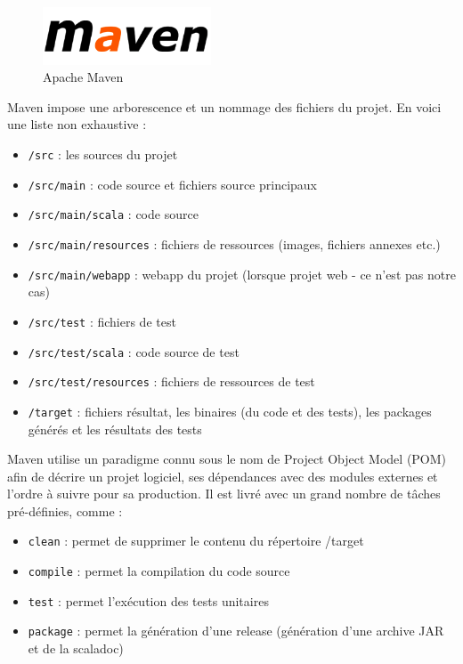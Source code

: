\documentclass[a4paper,11pt]{article}
\begin{document}
	\begin{figure}[!ht]
		\center
		\includegraphics [width=50mm]{./images/maven.png}
		\caption{Apache Maven}
	\end{figure}

Maven impose une arborescence et un nommage des fichiers du projet. En voici une liste non exhaustive :
	\begin{itemize}
		\item \texttt{/src} : les sources du projet
		\item \texttt{/src/main} : code source et fichiers source principaux
		\item \texttt{/src/main/scala} : code source
		\item \texttt{/src/main/resources} : fichiers de ressources (images, fichiers annexes etc.)
		\item \texttt{/src/main/webapp} : webapp du projet (lorsque projet web - ce n'est pas notre cas)
		\item \texttt{/src/test} : fichiers de test
		\item \texttt{/src/test/scala} : code source de test
		\item \texttt{/src/test/resources} : fichiers de ressources de test
		\item \texttt{/target} : fichiers résultat, les binaires (du code et des tests), les packages générés et les résultats des tests
	\end{itemize}
	
Maven utilise un paradigme connu sous le nom de Project Object Model (POM) afin de décrire un projet logiciel, ses dépendances avec des modules externes et l'ordre à suivre pour sa production. Il est livré avec un grand nombre de tâches pré-définies, comme :
	\begin{itemize}
		\item \texttt{clean} : permet de supprimer le contenu du répertoire /target
		\item \texttt{compile} : permet la compilation du code source
    	\item \texttt{test} : permet l'exécution des tests unitaires
    	\item \texttt{package} : permet la génération d'une release (génération d'une archive JAR et de la scaladoc)
	\end{itemize}
\end{document}
